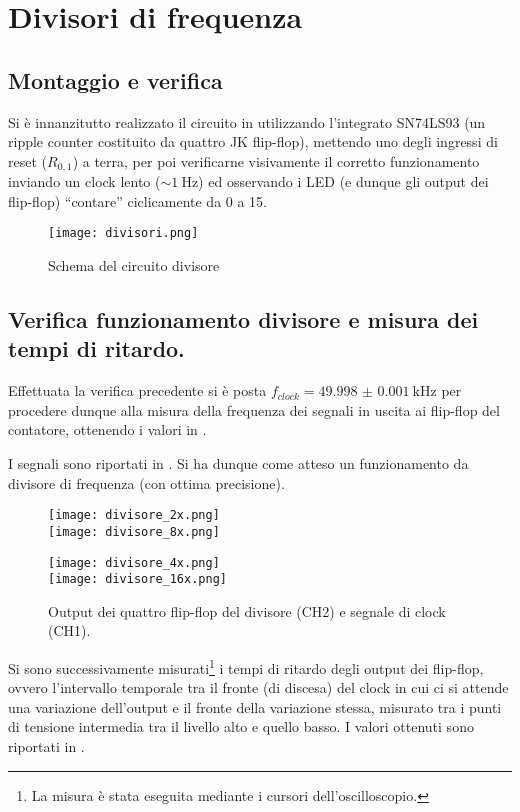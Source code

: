 \section{Divisori di frequenza}
\subsection{Montaggio e verifica}
Si è innanzitutto realizzato il circuito in  utilizzando l'integrato SN74LS93 (un ripple counter costituito da quattro JK flip-flop), mettendo uno degli ingressi di reset ($R_{0,1}$) a terra, per poi verificarne visivamente il corretto funzionamento inviando un clock lento ($\sim \SI{1}{\Hz}$) ed osservando i LED (e dunque gli output dei flip-flop) ``contare'' ciclicamente da 0 a 15.

\begin{figure}[h]
	\centering
	\texttt{[image: divisori.png]}
	\caption{Schema del circuito divisore}
	\label{fig:div}
\end{figure}

\subsection{Verifica funzionamento divisore e misura dei tempi di ritardo.}
Effettuata la verifica precedente si è posta $f_{clock} = \SI{49.998(1)}{ \kilo \hertz}$ per procedere dunque alla misura della frequenza dei segnali in uscita ai flip-flop del contatore, ottenendo i valori in .

I segnali sono riportati in . Si ha dunque come atteso un funzionamento da divisore di frequenza (con ottima precisione).

\begin{figure}[h]
	\centering
	\begin{minipage}{0.49\textwidth}
		\centering
		\texttt{[image: divisore\_2x.png]}
		\\
		\texttt{[image: divisore\_8x.png]}
	\end{minipage}
	\begin{minipage}{0.49\textwidth}
		\centering
		\texttt{[image: divisore\_4x.png]}
		\\
		\texttt{[image: divisore\_16x.png]}
	\end{minipage}
	\caption{Output dei quattro flip-flop del divisore (CH2) e segnale di clock (CH1).}
	\label{fig:divout}
\end{figure}

Si sono successivamente misurati\footnote{La misura è stata eseguita mediante i cursori dell'oscilloscopio.} i tempi di ritardo degli output dei flip-flop, ovvero l'intervallo temporale tra il fronte (di discesa) del clock in cui ci si attende una variazione dell'output e il fronte della variazione stessa, misurato tra i punti di tensione intermedia tra il livello alto e quello basso. I valori ottenuti sono riportati in . %


